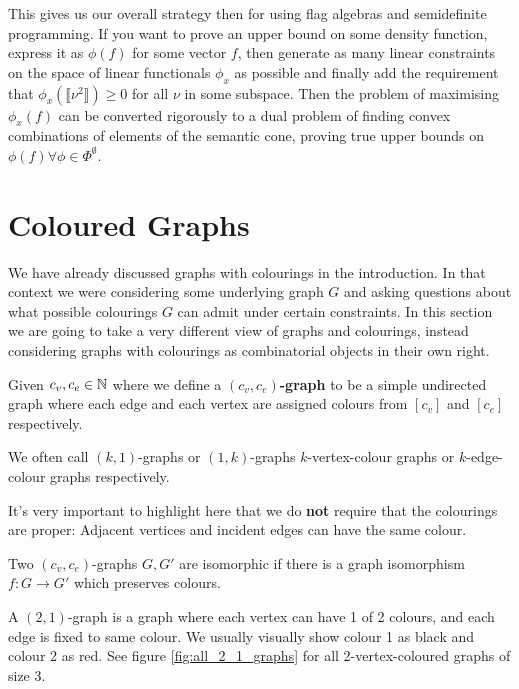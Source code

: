 This gives us our overall strategy then for using flag algebras and semidefinite programming.
If you want to prove an upper bound on some density function, express it as $\phi(f)$ for
some vector $f$, then generate as many linear constraints on the space of linear functionals
$\phi_x$ as possible and finally add the requirement that $\phi_x(\llbracket \nu^2\rrbracket)\geq 0$
for all $\nu$ in some subspace. Then the problem of maximising $\phi_x(f)$ can be
converted rigorously to a dual problem of finding convex combinations of elements of the
semantic cone, proving true upper bounds on $\phi(f)\forall\phi\in\Phi^\emptyset$.

\section{Coloured Graphs}
\label{sec:coloured_graphs}

We have already discussed graphs with colourings in the introduction. In that context
we were considering some underlying graph $G$ and asking questions about what possible
colourings $G$ can admit under certain constraints. In this section we are going to take
a very different view of graphs and colourings, instead considering graphs with colourings
as combinatorial objects in their own right.

\begin{definition}[$(c_v, c_e)$-Graph]
    Given $c_v, c_e \in \mathbb{N}$ where we define a
    \textbf{$(c_v, c_e)$-graph} to be a simple undirected graph where each edge and
    each vertex are assigned colours from $[c_v]$ and $[c_e]$ respectively.

    We often call $(k, 1)$-graphs or $(1,k)$-graphs $k$-vertex-colour graphs or
    $k$-edge-colour graphs respectively.
\end{definition}
\begin{note}
    It's very important to highlight here that we do \textbf{not} require that the colourings
    are proper: Adjacent vertices and incident edges can have the same colour.
\end{note}
\begin{definition}
    Two $(c_v,c_e)$-graphs $G, G'$ are isomorphic if there is a graph isomorphism
    $f\colon G \to G'$ which preserves colours.
\end{definition}

\begin{example}
    A $(2, 1)$-graph is a graph where each vertex can have 1 of 2 colours, and each edge is fixed
    to same colour. We usually visually show colour 1 as black and colour 2 as red. See
    figure \ref{fig:all_2_1_graphs} for all 2-vertex-coloured graphs of size 3.
\end{example}

